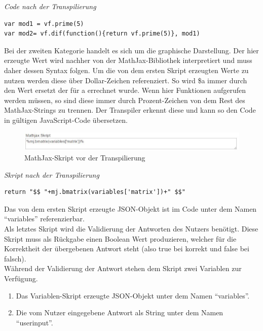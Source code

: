 \emph{Code nach der Transpilierung}
\begin{lstlisting}
var mod1 = vf.prime(5)
var mod2= vf.dif(function(){return vf.prime(5)}, mod1)
\end{lstlisting}


Bei der zweiten Kategorie handelt es sich um die graphische Darstellung. Der hier erzeugte Wert wird nachher von der MathJax-Bibliothek interpretiert und muss daher dessen Syntax folgen. Um die von dem ersten Skript erzeugten Werte zu nutzen werden diese über Dollar-Zeichen referenziert. So wird \$a immer durch den Wert ersetzt der für a errechnet wurde.  Wenn hier Funktionen aufgerufen werden müssen, so sind diese immer durch Prozent-Zeichen von dem Rest des MathJax-Strings zu trennen. Der Transpiler erkennt diese und kann so den Code in gültigen JavaScript-Code übersetzen. \\

\begin{figure}[htp]     %
\centering
\includegraphics[width=1\textwidth]{bilder/MathJaxPreTrans} 
\caption[MathJax-Skript vor der Transpilierung]{MathJax-Skript vor der Transpilierung}
\end{figure} 

\emph{Skript nach der Transpilierung}
\begin{lstlisting}
return "$$ "+mj.bmatrix(variables['matrix'])+" $$"
\end{lstlisting}
Das von dem ersten Skript erzeugte JSON-Objekt ist im Code unter dem Namen ``variables'' referenzierbar. \\

Als letztes Skript wird die Validierung der Antworten des Nutzers benötigt. Diese Skript muss als Rückgabe einen Boolean Wert produzieren, welcher für die Korrektheit der übergebenen Antwort steht (also true bei korrekt und false bei falsch). \\
Während der Validierung der Antwort stehen dem Skript zwei Variablen zur Verfügung.\\
\begin{enumerate}
\itemsep0em
\item Das Variablen-Skript erzeugte JSON-Objekt unter dem Namen ``variables''.
\item Die vom Nutzer eingegebene Antwort als String unter dem Namen ``userinput''.
\end{enumerate}

